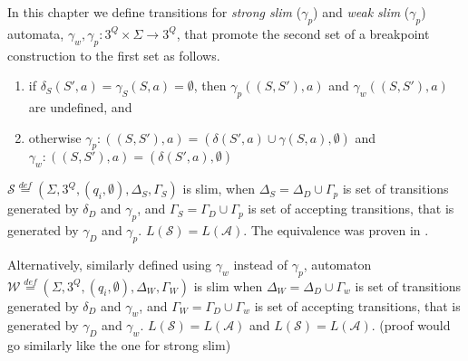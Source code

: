 \documentclass[
	digital
nolof, nolot
]{fithesis3}
\newcommand{\cA}{\mathcal{A}}
\newcommand{\cS}{\mathcal{S}}
\newcommand{\lA}{L(\cA)}
\newcommand{\lS}{L(\cS)}
\newcommand{\eqdef}{\overset{def}{=}}
\begin{document}
			In this chapter we define transitions for \emph{strong slim} ($\gamma_{p}$) and \emph{weak slim} ($\gamma_{p}$) automata,
			 $\gamma_w, \gamma_p:3^Q \times \Sigma \rightarrow 3^Q$, that promote the second set of a breakpoint construction to the first set as follows. 
			
			\begin{enumerate}
				\item if $\delta_S(S',a) = \gamma_S(S, a) = \emptyset$, then $\gamma_{p}((S,S'), a)$ and $\gamma_{w}((S,S'), a)$ are undefined, and
				\item otherwise
				$\gamma_{p}:((S,S'),a)=(\delta(S',a)\cup\gamma(S, a),\emptyset)$ and $\gamma_{w}:((S,S'),a)=(\delta(S',a),\emptyset)$
			\end{enumerate}
			
			
			$\cS\eqdef(\Sigma, 3^Q, (q_i,\emptyset), \Delta_S ,\Gamma_S)$ is slim, when
			$\Delta_S=\Delta_D \cup \Gamma_p$ is set of transitions generated by $\delta_D$ and $\gamma_p$, and
			$\Gamma_S=\Gamma_D \cup \Gamma_p$ is set of accepting transitions, that is generated by $\gamma_D$ and $\gamma_p$. $\lS = \lA$. The equivalence was proven in \cite{hlavni}.
			
			Alternatively, similarly defined using $\gamma_w$ instead of $\gamma_{p}$, automaton $\mathcal{W}\eqdef(\Sigma, 3^Q, (q_i,\emptyset), \Delta_W, \Gamma_W)$ is slim  when
			$\Delta_W=\Delta_D \cup \Gamma_w$ is set of transitions generated by $\delta_D$ and $\gamma_w$, and
			$\Gamma_W=\Gamma_D \cup \Gamma_w$ is set of accepting transitions, that is generated by $\gamma_D$ and $\gamma_w$. $\lS = \lA$ and $\lS=\lA$. (proof would go similarly like the one for strong slim)
			
\end{document}
